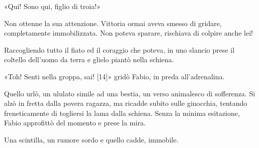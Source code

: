 «Qui! Sono qui, figlio di troia!»

Non ottenne la sua attenzione. Vittoria ormai aveva smesso di gridare, completamente immobilizzata. Non poteva sparare, rischiava di colpire anche lei!

Raccogliendo tutto il fiato ed il coraggio che poteva, in uno slancio prese il coltello dell'uomo da terra e glielo piantò nella schiena.

«Toh! Senti nella groppa, sai! [14]» gridò Fabio, in preda all'adrenalina.

Quello urlò, un ululato simile ad una bestia, un verso animalesco di sofferenza. Si alzò in fretta dalla povera ragazza, ma ricadde subito sulle ginocchia, tentando freneticamente di togliersi la lama dalla schiena. Senza la minima esitazione, Fabio approfittò del momento e prese la mira.

Una scintilla, un rumore sordo e quello cadde, immobile.